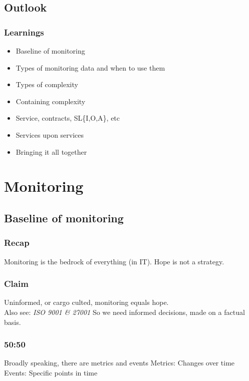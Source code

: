 \documentclass[aspectratio=169]{beamer}
\begin{document}
\subsection{Outlook}

\begin{frame}
	\frametitle{Learnings}
	\vfill
	\begin{itemize}

		\item Baseline of monitoring
		\item Types of monitoring data and when to use them

		\item Types of complexity
		\item Containing complexity

		\item Service, contracts, SL\{I,O,A\}, etc
		\item Services upon services

		\item Bringing it all together
	\end{itemize}
	\vfill
\end{frame}



\section{Monitoring}


\subsection{Baseline of monitoring}

\begin{frame}
	\frametitle{Recap}
	\begin{center}
		\vfill
		Monitoring is the bedrock of everything (in IT).
		\vfill
		Hope is not a strategy.
		\vfill
	\end{center}
\end{frame}

\begin{frame}
	\frametitle{Claim}
	\begin{center}
		\vfill
		Uninformed, or cargo culted, monitoring equals hope.\\
		Also see: \textit{ISO 9001 \& 27001}
		\vfill
		So we need informed decisions, made on a factual basis.
		\vfill
	\end{center}
\end{frame}


\begin{frame}
	\frametitle{50:50}
	\begin{center}
		\vfill
		Broadly speaking, there are metrics and events
		\vfill
		Metrics: Changes over time
		\vfill
		Events: Specific points in time
		\vfill
	\end{center}
\end{frame}
\end{document}
